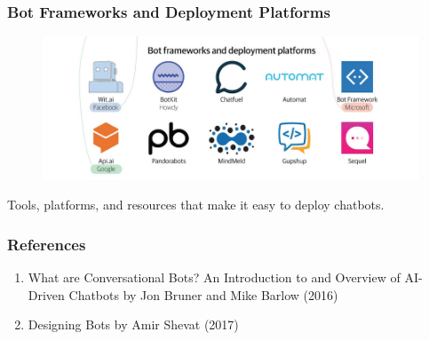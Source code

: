 \documentclass[11pt]{beamer}
\begin{document}
\begin{frame}
\frametitle{Bot Frameworks and Deployment Platforms}
\begin{figure}[h]
	\centering
	\includegraphics[scale=.5]{images/bot-frameworks}
\end{figure}
Tools, platforms, and resources that make it easy to deploy chatbots.
\end{frame}


\begin{frame}
\frametitle{References}
\begin{enumerate}
	\item What are Conversational Bots? An Introduction to and Overview of AI-Driven Chatbots by Jon Bruner and Mike Barlow (2016)
	\item Designing Bots by Amir Shevat (2017)
\end{enumerate}
\end{frame}
\end{document}
